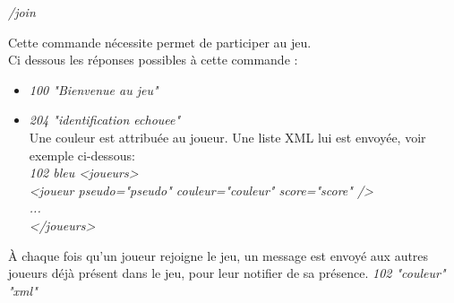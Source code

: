 \par
\textit{/join}

\par
Cette commande nécessite permet de participer au jeu.\\

Ci dessous les réponses possibles à cette commande :

\begin{itemize}

	\item \textit{100 "Bienvenue au jeu"} 

	\item \textit{204 "identification echouee"} \\
	Une couleur est attribuée au joueur. Une liste XML\label{xml} lui est envoyée, voir exemple ci-dessous:\\
	
		\textit{102 bleu <joueurs>} \\
			\tabto{1cm} \textit{<joueur pseudo="pseudo" couleur="couleur" score="score" />} \\
			\tabto{1cm}	\textit{...} \\
		\textit{</joueurs>}

\end{itemize}

À chaque fois qu'un joueur rejoigne le jeu, un message est envoyé aux autres joueurs déjà présent dans le jeu, pour leur notifier de sa présence.
\textit{102 "couleur" "xml"} \\